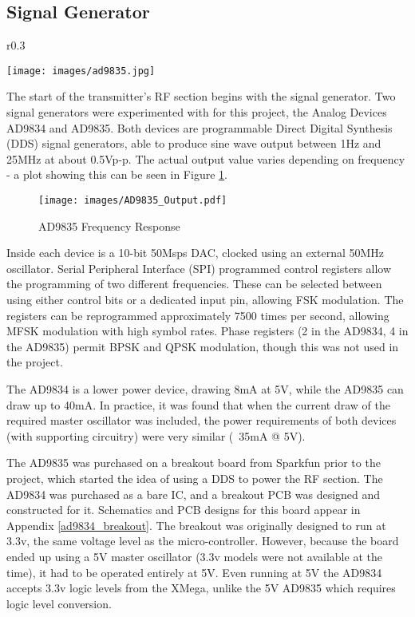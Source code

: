 \documentclass[a4paper,12pt]{article}
\begin{document}
\subsection{Signal Generator}
\begin{wrapfigure}{r}{0.3\textwidth}
  \begin{center}
    \texttt{[image: images/ad9835.jpg]}
  \end{center}
  \caption{AD9835 Breakout Board}
  \label{fig:ad9835}
\end{wrapfigure}
The start of the transmitter's RF section begins with the signal generator. Two signal generators were experimented with for this project, the Analog Devices AD9834 and AD9835. Both devices are programmable Direct Digital Synthesis (DDS) signal generators, able to produce sine wave output between 1Hz and 25MHz at about 0.5Vp-p. The actual output value varies depending on frequency - a plot showing this can be seen in Figure \ref{fig:ad9835_output}.

\begin{figure}%
  \begin{center}
    \texttt{[image: images/AD9835\_Output.pdf]}
  \end{center}
  \caption{AD9835 Frequency Response}
  \label{fig:ad9835_output}
\end{figure}

Inside each device is a 10-bit 50Msps DAC, clocked using an external 50MHz oscillator. Serial Peripheral Interface (SPI) programmed control registers allow the programming of two different frequencies. These can be selected between using either control bits or a dedicated input pin, allowing FSK modulation. The registers can be reprogrammed approximately 7500 times per second, allowing MFSK modulation with high symbol rates. Phase registers (2 in the AD9834, 4 in the AD9835) permit BPSK and QPSK modulation, though this was not used in the project.

The AD9834 is a lower power device, drawing 8mA at 5V, while the AD9835 can draw up to 40mA. In practice, it was found that when the current draw of the required master oscillator was included, the power requirements of both devices (with supporting circuitry) were very similar (~35mA @ 5V).

The AD9835 was purchased on a breakout board from Sparkfun prior to the project, which started the idea of using a DDS to power the RF section. The AD9834 was purchased as a bare IC, and a breakout PCB was designed and constructed for it. Schematics and PCB designs for this board appear in Appendix \ref{ad9834_breakout}. The breakout was originally designed to run at 3.3v, the same voltage level as the micro-controller. However, because the board ended up using a 5V master oscillator (3.3v models were not available at the time), it had to be operated entirely at 5V. Even running at 5V the AD9834 accepts 3.3v logic levels from the XMega, unlike the 5V AD9835 which requires logic level conversion.
\end{document}
